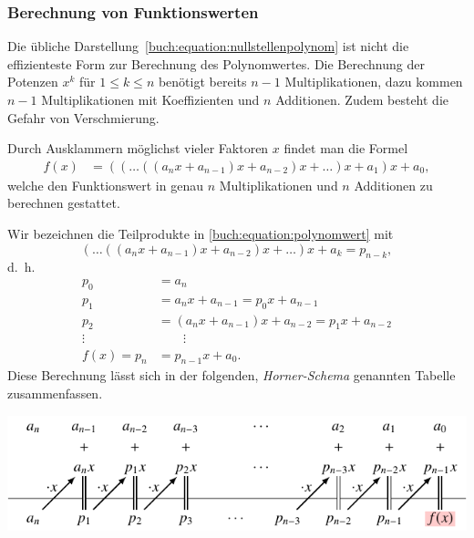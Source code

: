 \subsubsection{Berechnung von Funktionswerten}
Die übliche Darstellung~\eqref{buch:equation:nullstellenpolynom}
ist nicht die effizienteste Form zur Berechnung des Polynomwertes.
Die Berechnung der Potenzen $x^k$ für $1\le k\le n$ benötigt bereits
$n-1$ Multiplikationen, dazu kommen $n-1$ Multiplikationen mit
Koeffizienten und $n$ Additionen.
Zudem besteht die Gefahr von Verschmierung.

Durch Ausklammern möglichst vieler Faktoren $x$ findet man die
Formel
%
\begin{align}
f(x)
&=
((\dots((a_nx+a_{n-1})x+a_{n-2})x+\dots)x+a_1)x+a_0,
\label{buch:equation:polynomwert}
\end{align}
welche den Funktionswert in genau $n$ Multiplikationen und $n$ Additionen
zu berechnen gestattet.

Wir bezeichnen die Teilprodukte in \eqref{buch:equation:polynomwert} mit
%
\[
(\dots((a_nx+a_{n-1})x+a_{n-2})x+\dots)x+a_k
=
p_{n-k},
\]
d.~h.
\begin{equation}
\begin{aligned}
p_0 &= a_n
\\
p_1 &= a_nx+a_{n-1} = p_0x + a_{n-1}
\\
p_2 &= (a_nx+a_{n-1})x+a_{n-2} = p_1x+a_{n-2}
\\
\vdots\;&\qquad\vdots
\\
f(x)
=
p_n
&=
p_{n-1}x+a_0.
\end{aligned}
\label{buch:equation:reste}
\end{equation}
Diese Berechnung lässt sich in der folgenden, {\em Horner-Schema}
genannten Tabelle
%
zusammenfassen.
\begin{center}
\includegraphics{chapters/20-gleichungen/figures/horner1.pdf}
\end{center}

